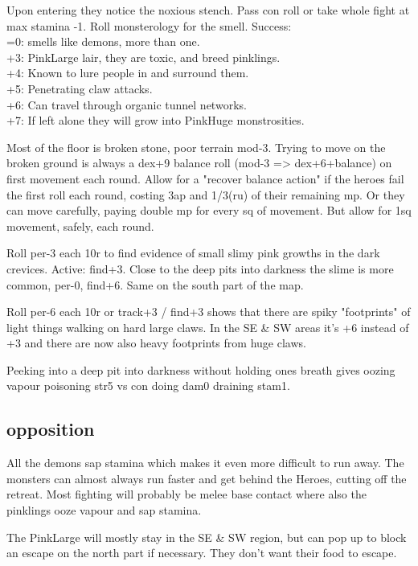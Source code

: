 Upon entering they notice the noxious stench. Pass con roll or take whole fight at max stamina -1. Roll monsterology for the smell. Success:\\
=0: smells like demons, more than one.\\
+3: PinkLarge lair, they are toxic, and breed pinklings.\\
+4: Known to lure people in and surround them.\\
+5: Penetrating claw attacks.\\
+6: Can travel through organic tunnel networks.\\
+7: If left alone they will grow into PinkHuge monstrosities.

Most of the floor is broken stone, poor terrain mod-3.
Trying to move on the broken ground is always a dex+9 balance roll (mod-3 => dex+6+balance) on first movement each round. Allow for a "recover balance action" if the heroes fail the first roll each round, costing 3ap and 1/3(ru) of their remaining mp.
Or they can move carefully, paying double mp for every sq of movement. But allow for 1sq movement, safely, each round.

Roll per-3 each 10r to find evidence of small slimy pink growths in the dark crevices. Active: find+3. Close to the deep pits into darkness the slime is more common, per-0, find+6. Same on the south part of the map.

Roll per-6 each 10r or track+3 / find+3 shows that there are spiky "footprints" of light things walking on hard large claws. In the SE \& SW areas it's +6 instead of +3 and there are now also heavy footprints from huge claws.

Peeking into a deep pit into darkness without holding ones breath gives oozing vapour poisoning str5 vs con doing dam0 draining stam1.


\subsection*{opposition}
All the demons sap stamina which makes it even more difficult to run away. The monsters can almost always run faster and get behind the Heroes, cutting off the retreat. Most fighting will probably be melee base contact where also the pinklings ooze vapour and sap stamina.

The PinkLarge will mostly stay in the SE \& SW region, but can pop up to block an escape on the north part if necessary. They don't want their food to escape.



